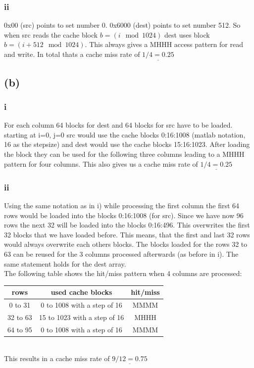 \documentclass[10pt,a4paper,oneside,notitlepage]{report}
\begin{document}
\subsubsection*{ii}
0x00 (src) points to set number 0. 0x6000 (dest) points to set number 512.
So when src reads the cache block $b=(i \mod 1024)$ dest uses block $b=(i+512 \mod 1024)$. This always gives a MHHH access pattern for read and write. In total thats a cache miss rate of $\underline{1/4=0.25}$

\subsection*{(b)}
\subsubsection*{i}
For each column 64 blocks for dest and 64 blocks for src have to be loaded. starting at i=0, j=0 src would use the cache blocks 0:16:1008 (matlab notation, 16 as the stepsize) and dest would use the cache blocks 15:16:1023. After loading the block they can be used for the following three columns leading to a MHHH pattern for four columns. This also gives us a cache miss rate of $\underline{1/4=0.25}$

\subsubsection*{ii}
Using the same notation as in i) while processing the first column the first 64 rows would be loaded into the blocks 0:16:1008 (for src). Since we have now 96 rows the next 32 will be loaded into the blocks 0:16:496. This overwrites the first 32 blocks that we have loaded before.   This means, that the first and last 32 rows would always overwrite each others blocks. The blocks loaded for the rows 32 to 63 can be reused for the 3 columns processed afterwards (as before in i). The same statement holds for the dest array.\\
The following table shows the hit/miss pattern when 4 columns are processed:\\
\begin{tabular}{|c|c|c|}
\hline 
\rowcolor{gray!30}
\textbf{rows}  & \textbf{used cache blocks} & \textbf{hit/miss} \\ 
\hline 
0 to 31 & 0 to 1008 with a step of 16 & MMMM \\ 
\hline 
32 to 63 & 15 to 1023 with a step of 16 & MHHH \\ 
\hline 
64 to 95 & 0 to 1008 with a step of 16 & MMMM \\ 
\hline 
\end{tabular}  \\
This results in a cache miss rate of $\underline{9/12=0.75}$
\end{document}
